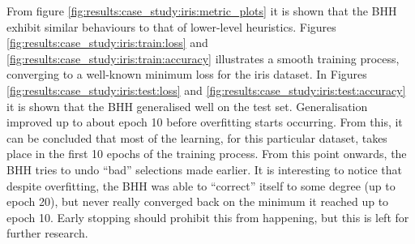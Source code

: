 From figure \ref{fig:results:case_study:iris:metric_plots} it is shown that the \Acs{BHH} exhibit similar behaviours to that of lower-level heuristics. Figures \ref{fig:results:case_study:iris:train:loss} and \ref{fig:results:case_study:iris:train:accuracy} illustrates a smooth training process, converging to a well-known minimum loss for the iris dataset. In Figures \ref{fig:results:case_study:iris:test:loss} and \ref{fig:results:case_study:iris:test:accuracy} it is shown that the \Acs{BHH} generalised well on the test set. Generalisation improved up to about epoch 10 before overfitting starts occurring. From this, it can be concluded that most of the learning, for this particular dataset, takes place in the first 10 epochs of the training process. From this point onwards, the \Acs{BHH} tries to undo ``bad'' selections made earlier. It is interesting to notice that despite overfitting, the \Acs{BHH} was able to ``correct'' itself to some degree (up to epoch 20), but never really converged back on the minimum it reached up to epoch 10. Early stopping should prohibit this from happening, but this is left for further research.

